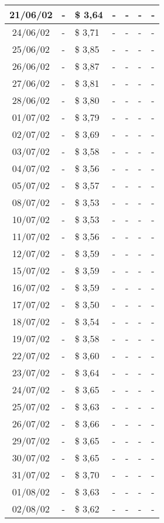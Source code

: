 \begin{center}
\begin{longtable}{|c|p{1.5cm}|p{1.5cm}|p{1.5cm}|p{1.5cm}|p{1.5cm}|p{1.5cm}|}
21/06/02 & - & \$ 3,64 & - & - & - & - \\ \hline
24/06/02 & - & \$ 3,71 & - & - & - & - \\ \hline
25/06/02 & - & \$ 3,85 & - & - & - & - \\ \hline
26/06/02 & - & \$ 3,87 & - & - & - & - \\ \hline
27/06/02 & - & \$ 3,81 & - & - & - & - \\ \hline
28/06/02 & - & \$ 3,80 & - & - & - & - \\ \hline
01/07/02 & - & \$ 3,79 & - & - & - & - \\ \hline
02/07/02 & - & \$ 3,69 & - & - & - & - \\ \hline
03/07/02 & - & \$ 3,58 & - & - & - & - \\ \hline
04/07/02 & - & \$ 3,56 & - & - & - & - \\ \hline
05/07/02 & - & \$ 3,57 & - & - & - & - \\ \hline
08/07/02 & - & \$ 3,53 & - & - & - & - \\ \hline
10/07/02 & - & \$ 3,53 & - & - & - & - \\ \hline
11/07/02 & - & \$ 3,56 & - & - & - & - \\ \hline
12/07/02 & - & \$ 3,59 & - & - & - & - \\ \hline
15/07/02 & - & \$ 3,59 & - & - & - & - \\ \hline
16/07/02 & - & \$ 3,59 & - & - & - & - \\ \hline
17/07/02 & - & \$ 3,50 & - & - & - & - \\ \hline
18/07/02 & - & \$ 3,54 & - & - & - & - \\ \hline
19/07/02 & - & \$ 3,58 & - & - & - & - \\ \hline
22/07/02 & - & \$ 3,60 & - & - & - & - \\ \hline
23/07/02 & - & \$ 3,64 & - & - & - & - \\ \hline
24/07/02 & - & \$ 3,65 & - & - & - & - \\ \hline
25/07/02 & - & \$ 3,63 & - & - & - & - \\ \hline
26/07/02 & - & \$ 3,66 & - & - & - & - \\ \hline
29/07/02 & - & \$ 3,65 & - & - & - & - \\ \hline
30/07/02 & - & \$ 3,65 & - & - & - & - \\ \hline
31/07/02 & - & \$ 3,70 & - & - & - & - \\ \hline
01/08/02 & - & \$ 3,63 & - & - & - & - \\ \hline
02/08/02 & - & \$ 3,62 & - & - & - & - \\ \hline

\end{longtable}
\end{center}
